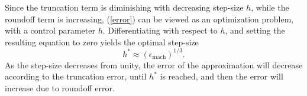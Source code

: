\documentclass[11pt]{article}
\begin{document}
Since the truncation term is diminishing with decreasing step-size $h$, while the roundoff term is increasing, (\ref{error}) 
can be viewed as an optimization problem, with a control parameter $h$. Differentiating with respect to $h$, and setting
the resulting equation to zero yields the optimal step-size
\begin{equation}
h^{\ast} \approx (\epsilon_{\text{mach}})^{1/3}.
\end{equation}
As the step-size decreases from unity, the error of the approximation will decrease according to the truncation error, until
$h^{\ast}$ is reached, and then the error will increase due to roundoff error.
\end{document}
